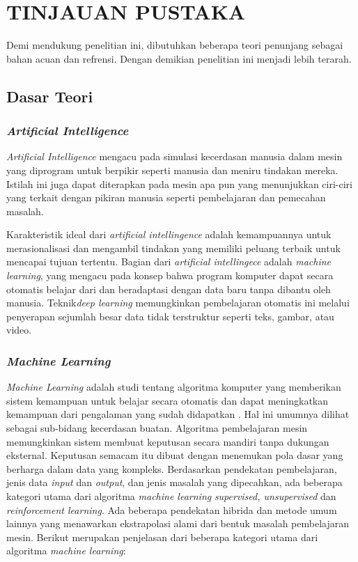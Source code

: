 \chapter{TINJAUAN PUSTAKA}
\label{chap:tinjauanpustaka}


Demi mendukung penelitian ini, dibutuhkan beberapa teori penunjang sebagai bahan acuan dan refrensi. Dengan demikian penelitian ini menjadi lebih terarah.

\section{Dasar Teori}
\label{sec:dasarteori}

\subsection{\textit{Artificial Intelligence}}
\label{subsec:artificial-itelligence}

\textit{Artificial Intelligence} mengacu pada simulasi kecerdasan manusia dalam mesin yang diprogram untuk berpikir seperti manusia dan meniru tindakan mereka.\citep{artificialintellingece} Istilah ini juga dapat diterapkan pada mesin apa pun yang menunjukkan ciri-ciri yang terkait dengan pikiran manusia seperti pembelajaran dan pemecahan masalah.

Karakteristik ideal dari \textit{artificial intellingence} adalah kemampuannya untuk merasionalisasi dan mengambil tindakan yang memiliki peluang terbaik untuk mencapai tujuan tertentu. Bagian dari \textit{artificial intellingece} adalah \textit{machine learning}, yang mengacu pada konsep bahwa program komputer dapat secara otomatis belajar dari dan beradaptasi dengan data baru tanpa dibantu oleh manusia. Teknik\textit{deep learning} memungkinkan pembelajaran otomatis ini melalui penyerapan sejumlah besar data tidak terstruktur seperti teks, gambar, atau video.

\subsection{\textit{Machine Learning}}
\label{subsec:machine-learning}

\textit{Machine Learning} adalah studi tentang algoritma komputer yang memberikan sistem kemampuan untuk belajar secara otomatis dan dapat meningkatkan kemampuan dari pengalaman yang sudah didapatkan \citep{machinelearning1}. Hal ini umumnya dilihat sebagai sub-bidang kecerdasan buatan. Algoritma pembelajaran mesin memungkinkan sistem membuat keputusan secara mandiri tanpa dukungan eksternal. Keputusan semacam itu dibuat dengan menemukan pola dasar yang berharga dalam data yang kompleks. Berdasarkan pendekatan pembelajaran, jenis data \textit{input} dan \textit{output}, dan jenis masalah yang dipecahkan, ada beberapa kategori utama dari algoritma \textit{machine learning} \textit{supervised, unsupervised} dan \textit{reinforcement learning}. Ada beberapa pendekatan hibrida dan metode umum lainnya yang menawarkan ekstrapolasi alami dari bentuk masalah pembelajaran mesin. Berikut merupakan penjelasan dari beberapa kategori utama dari algoritma \textit{machine learning}:

